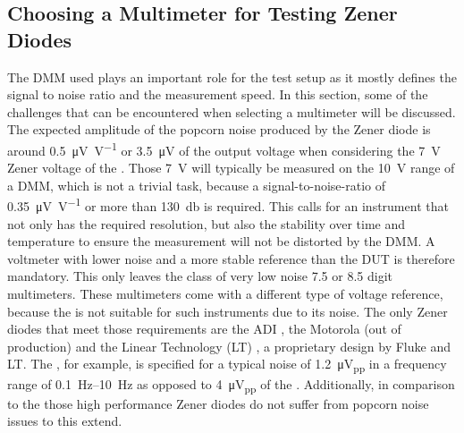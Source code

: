\subsection{Choosing a Multimeter for Testing Zener Diodes}
The DMM used plays an important role for the test setup as it mostly defines the signal to noise ratio and the measurement speed. In this section, some of the challenges that can be encountered when selecting a multimeter will be discussed. The expected amplitude of the popcorn noise produced by the  Zener diode is around \qty[per-mode=symbol]{0.5}{\micro\volt \per \volt} or \qty{3.5}{\micro\volt} of the output voltage when considering the \qty{7}{\volt} Zener voltage of the . Those \qty{7}{\volt} will typically be measured on the \qty{10}{\volt} range of a DMM, which is not a trivial task, because a signal-to-noise-ratio of \qty[per-mode=symbol]{0.35}{\micro\volt \per \volt} or more than \qty{130}{\decibel} is required. This calls for an instrument that not only has the required resolution, but also the stability over time and temperature to ensure the measurement will not be distorted by the DMM. A voltmeter with lower noise and a more stable reference than the DUT is therefore mandatory. This only leaves the class of very low noise \num{7.5} or \num{8.5} digit multimeters. These multimeters come with a different type of voltage reference, because the  is not suitable for such instruments due to its noise. The only Zener diodes that meet those requirements are the ADI  \cite{datasheet_LTZ1000}, the Motorola  (out of production) and the Linear Technology (LT) , a proprietary design by Fluke and LT. The , for example, is specified for a typical noise of \qty{1.2}{\micro\volt_{pp}} in a frequency range of \qtyrange{0.1}{10}{\Hz} \cite{datasheet_LTZ1000} as opposed to \qty{4}{\uV_{pp}} of the . Additionally, in comparison to the  those high performance Zener diodes do not suffer from popcorn noise issues to this extend.

